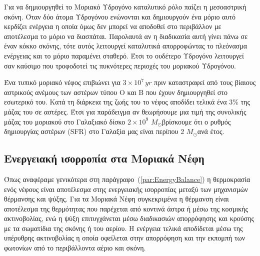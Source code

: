 \documentclass[a4paper,12pt]{memoir}
\newcommand{\sm}{$M_{\odot}$}
\begin{document}
Για να δημιουργηθεί το Μοριακό Υδρογόνο καταλυτικό ρόλο παίζει η μεσοαστρική σκόνη.  Όταν δύο άτομα Υδρογόνου ενώνονται και δημιουργούν ένα μόριο  αυτό κερδίζει ενέργεια η οποία όμως δεν μπορεί να αποδοθεί στο περιβάλλον με αποτέλεσμα το μόριο να διασπάται. Παρολαυτά αν η διαδικασία αυτή γίνει πάνω σε έναν κόκκο σκόνης, τότε αυτός λειτουργεί καταλυτικά απορροφώντας το πλεόνασμα ενέργειας και το μόριο παραμένει σταθερό. Έτσι το ουδέτερο Υδρογόνο λειτουργεί σαν καύσιμο που τροφοδοτεί τις πυκνότερες περιοχές του μοριακού Υδρογόνου.

Ένα τυπικό μοριακό νέφος επιβιώνει για $3\times 10^7 \, yr$ πριν καταστραφεί από τους βίαιους αστρικούς ανέμους των αστέρων τύπου O και B που έχουν δημιουργηθεί στο εσωτερικό του. Κατά τη διάρκεια της ζωής του το νέφος αποδίδει τελικά ένα 3\% της μάζας του σε αστέρες. Έτσι για παράδειγμα αν θεωρήσουμε μια τιμή της συνολικής μάζας του μοριακού  στο Γαλαξιακό δίσκο $2\times 10^9$ \sm βρίσκουμε ότι ο ρυθμός δημιουργίας αστέρων (SFR) στο Γαλαξία μας είναι περίπου 2 \sm ανά έτος.  

\subsection{Ενεργειακή ισορροπία στα Μοριακά Νέφη}
Όπως αναφέραμε γενικότερα στη παράγραφο~(\ref{par:EnergyBalance}) η θερμοκρασία ενός νέφους είναι αποτέλεσμα στης ενεργειακής ισορροπίας μεταξύ των μηχανισμών θέρμανσης και ψύξης. Για τα Μοριακά Νέφη συγκεκριμένα η θέρμανση είναι αποτέλεσμα της θερμότητας που παρέχεται από κοντινά άστρα ή μέσω της κοσμικής ακτινοβολίας, ενώ η ψύξη επιτυγχάνεται μέσω διαδικασιών απορρόφησης και κρούσης με τα σωματίδια της σκόνης ή του αερίου.
Η ενέργεια τελικά αποδίδεται μέσω της υπέρυθρης ακτινοβολίας η οποία οφείλεται στην απορρόφηση και την εκπομπή των φωτονίων από το περιβάλλοντα αέριο και σκόνη.
\end{document}

